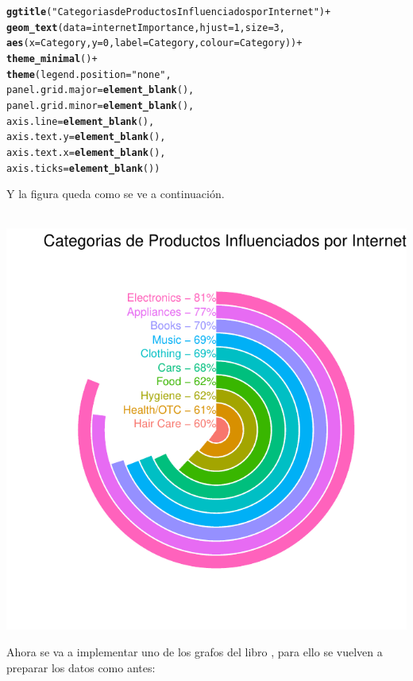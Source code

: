 \documentclass{article}\usepackage[]{graphicx}\usepackage[]{color}
\makeatletter
\def\maxwidth{ %
  \ifdim\Gin@nat@width>\linewidth
    \linewidth
  \else
    \Gin@nat@width
  \fi
}
\newcommand{\hlnum}[1]{\textcolor[rgb]{0.686,0.059,0.569}{#1}}%
\newcommand{\hlstr}[1]{\textcolor[rgb]{0.192,0.494,0.8}{#1}}%
\newcommand{\hlopt}[1]{\textcolor[rgb]{0,0,0}{#1}}%
\newcommand{\hlstd}[1]{\textcolor[rgb]{0.345,0.345,0.345}{#1}}%
\newcommand{\hlkwc}[1]{\textcolor[rgb]{0.333,0.667,0.333}{#1}}%
\newcommand{\hlkwd}[1]{\textcolor[rgb]{0.737,0.353,0.396}{\textbf{#1}}}%
\newenvironment{kframe}{%
 \def\at@end@of@kframe{}%
 \ifinner\ifhmode%
  \def\at@end@of@kframe{\end{minipage}}%
  \begin{minipage}{\columnwidth}%
 \fi\fi%
 \def\FrameCommand##1{\hskip\@totalleftmargin \hskip-\fboxsep
 \colorbox{shadecolor}{##1}\hskip-\fboxsep
     \hskip-\linewidth \hskip-\@totalleftmargin \hskip\columnwidth}%
 \MakeFramed {\advance\hsize-\width
   \@totalleftmargin\z@ \linewidth\hsize
   \@setminipage}}%
 {\par\unskip\endMakeFramed%
 \at@end@of@kframe}
\newenvironment{knitrout}{}{} %
\makeatother
\begin{document}
\begin{knitrout}
\color{fgcolor}\begin{kframe}
\begin{alltt}
  \hlkwd{ggtitle}\hlstd{(}\hlstr{"Categorias de Productos Influenciados por Internet"}\hlstd{)} \hlopt{+}
  \hlkwd{geom_text}\hlstd{(}\hlkwc{data} \hlstd{= internetImportance,} \hlkwc{hjust} \hlstd{=} \hlnum{1}\hlstd{,} \hlkwc{size} \hlstd{=} \hlnum{3}\hlstd{,}
            \hlkwd{aes}\hlstd{(}\hlkwc{x} \hlstd{= Category,} \hlkwc{y} \hlstd{=} \hlnum{0}\hlstd{,} \hlkwc{label} \hlstd{= Category,} \hlkwc{colour} \hlstd{= Category))} \hlopt{+}
  \hlkwd{theme_minimal}\hlstd{()} \hlopt{+}
  \hlkwd{theme}\hlstd{(}\hlkwc{legend.position} \hlstd{=} \hlstr{"none"}\hlstd{,}
        \hlkwc{panel.grid.major} \hlstd{=} \hlkwd{element_blank}\hlstd{(),}
        \hlkwc{panel.grid.minor} \hlstd{=} \hlkwd{element_blank}\hlstd{(),}
        \hlkwc{axis.line} \hlstd{=} \hlkwd{element_blank}\hlstd{(),}
        \hlkwc{axis.text.y} \hlstd{=} \hlkwd{element_blank}\hlstd{(),}
        \hlkwc{axis.text.x} \hlstd{=} \hlkwd{element_blank}\hlstd{(),}
        \hlkwc{axis.ticks} \hlstd{=} \hlkwd{element_blank}\hlstd{())}
\end{alltt}
\end{kframe}
\end{knitrout}
Y la figura queda como se ve a continuaci\'on.~\\~\\
\begin{knitrout}
\color{fgcolor}

{\centering \includegraphics[width=\maxwidth]{figure/plot_ggp_cb-1} 

}



\end{knitrout}
\clearpage
Ahora se va a implementar uno de los grafos del libro\cite[p\'ag 76]{Circle}
, para ello se vuelven a preparar los datos como antes:
\end{document}
